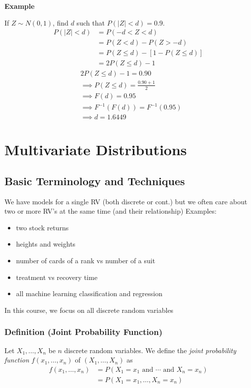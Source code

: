 \textbf{Example}

If $ Z \sim N(0,1) $, find $ d $ such that $ P(|Z|<d)=0.9 $.
\begin{align*}
    P(|Z|<d) & =P(-d<Z<d)                            \\
             & =P(Z<d)-P(Z>-d)                       \\
             & =P(Z\le d)-\left[ 1-P(Z\le d) \right] \\
             & =2P(Z\le d)-1
\end{align*}
\begin{align*}
     & 2P(Z\le d)-1=0.90                   \\
     & \implies P(Z\le d)=\frac{0.90+1}{2} \\
     & \implies F(d)=0.95                  \\
     & \implies F^{-1}(F(d))=F^{-1}(0.95)  \\
     & \implies d=1.6449
\end{align*}

\chapter{Multivariate Distributions}
\section{Basic Terminology and Techniques}
We have models for a single RV (both discrete or cont.) but we often
care about two or more RV's at the same time (and their relationship)
Examples:
\begin{itemize}
    \item two stock returns
    \item heights and weights
    \item number of cards of a rank vs number of a suit
    \item treatment vs recovery time
    \item all machine learning classification and regression
\end{itemize}
In this course, we focus on all discrete random variables

\begin{defbox}
    \subsection{Definition (Joint Probability Function)}
    Let $ X_1,\ldots,X_n $ be $ n $ discrete random variables.
    We define the \emph{joint probability function} $ f(x_1,\ldots,x_n) $ of
    $ (X_1,\ldots,X_n) $ as
    \begin{align*}
        f(x_1,\ldots,x_n) & =P(X_1=x_1 \text{ and } \cdots \text{ and } X_n=x_n) \\
                          & =P(X_1=x_1,\ldots,X_n=x_n)
    \end{align*}
\end{defbox}

